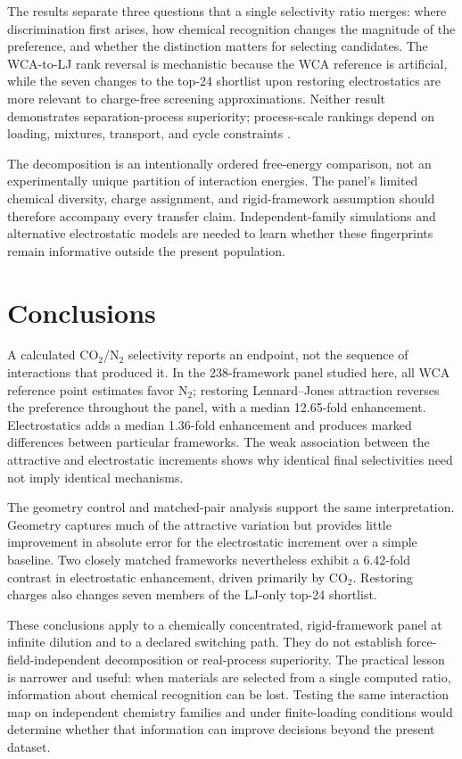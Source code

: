 \documentclass[journal=jctcce,manuscript=article]{achemso}
\begin{document}
The results separate three questions that a single selectivity ratio merges: where discrimination first arises, how chemical recognition changes the magnitude of the preference, and whether the distinction matters for selecting candidates. The WCA-to-LJ rank reversal is mechanistic because the WCA reference is artificial, while the seven changes to the top-24 shortlist upon restoring electrostatics are more relevant to charge-free screening approximations. Neither result demonstrates separation-process superiority; process-scale rankings depend on loading, mixtures, transport, and cycle constraints \cite{farmahini2020process,farmahini2021screening}.

The decomposition is an intentionally ordered free-energy comparison, not an experimentally unique partition of interaction energies. The panel's limited chemical diversity, charge assignment, and rigid-framework assumption should therefore accompany every transfer claim. Independent-family simulations and alternative electrostatic models are needed to learn whether these fingerprints remain informative outside the present population.

\section{Conclusions}
A calculated CO$_2$/N$_2$ selectivity reports an endpoint, not the sequence of interactions that produced it. In the 238-framework panel studied here, all WCA reference point estimates favor N$_2$; restoring Lennard--Jones attraction reverses the preference throughout the panel, with a median 12.65-fold enhancement. Electrostatics adds a median 1.36-fold enhancement and produces marked differences between particular frameworks. The weak association between the attractive and electrostatic increments shows why identical final selectivities need not imply identical mechanisms.

The geometry control and matched-pair analysis support the same interpretation. Geometry captures much of the attractive variation but provides little improvement in absolute error for the electrostatic increment over a simple baseline. Two closely matched frameworks nevertheless exhibit a 6.42-fold contrast in electrostatic enhancement, driven primarily by CO$_2$. Restoring charges also changes seven members of the LJ-only top-24 shortlist.

These conclusions apply to a chemically concentrated, rigid-framework panel at infinite dilution and to a declared switching path. They do not establish force-field-independent decomposition or real-process superiority. The practical lesson is narrower and useful: when materials are selected from a single computed ratio, information about chemical recognition can be lost. Testing the same interaction map on independent chemistry families and under finite-loading conditions would determine whether that information can improve decisions beyond the present dataset.
\end{document}
